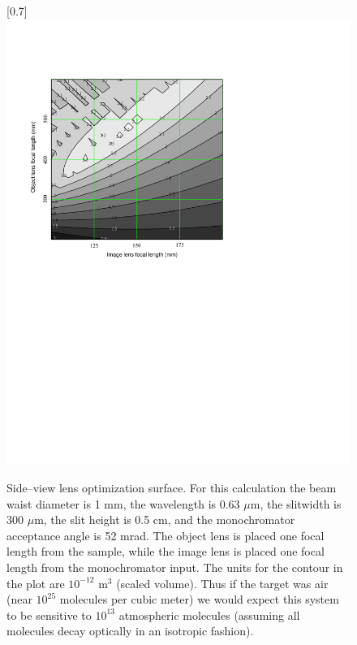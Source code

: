 \begin{figure}
\scalebox{0.7}[0.7]{
\includegraphics[bb=-60 360 489 725]
{side_view/side_view.pdf}
}
\caption[Side--view lens optimization surface]{Side--view lens optimization surface. For this calculation the beam waist diameter is 1 mm, the wavelength is 0.63 $\mu$m, the slitwidth is 300 $\mu$m, the slit height is 0.5 cm, and the monochromator acceptance angle is 52 mrad. The object lens is placed one focal length from the sample, while the image lens is placed one focal length from the monochromator input. The units for the contour in the plot are $10^{-12}$ m$^3$ (scaled volume). Thus if the target was air (near $10^{25}$ molecules per cubic meter) we would expect this system to be sensitive to $10^{13}$ atmospheric molecules (assuming all molecules decay optically in an isotropic fashion).}
\label{side_view}
\end{figure}
